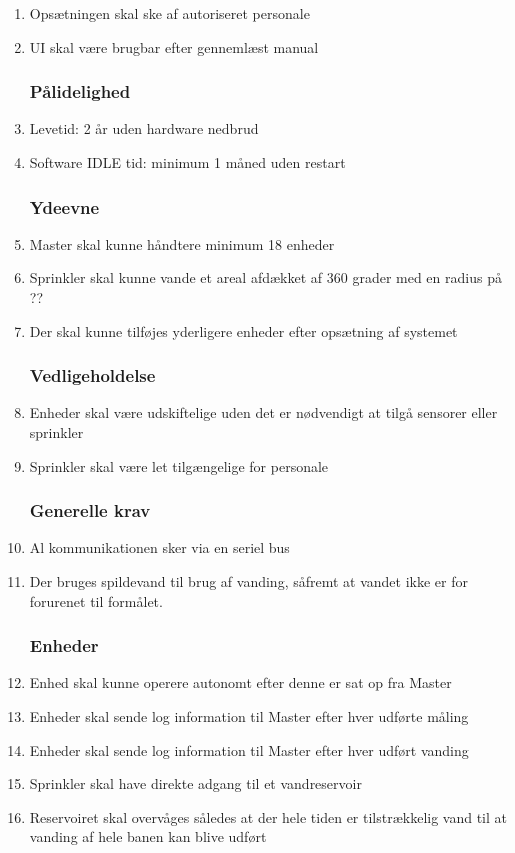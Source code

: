\begin{enumerate}

\subsubsection*{Brugbarhed}
\item Opsætningen skal ske af autoriseret personale
\item UI skal være brugbar efter gennemlæst manual


\subsubsection*{Pålidelighed}
\item Levetid: 2 år uden hardware nedbrud
\item Software IDLE tid: minimum 1 måned uden restart


\subsubsection*{Ydeevne}
\item Master skal kunne håndtere minimum 18 enheder
\item Sprinkler skal kunne vande et areal afdækket af 360 grader med en radius på ??
\item Der skal kunne tilføjes yderligere enheder efter opsætning af systemet


\subsubsection*{Vedligeholdelse}
\item Enheder skal være udskiftelige uden det er nødvendigt at tilgå sensorer eller sprinkler
\item Sprinkler skal være let tilgængelige for personale


\subsubsection*{Generelle krav}
\item Al kommunikationen sker via en seriel bus 
\item Der bruges spildevand til brug af vanding, såfremt at vandet ikke er for forurenet til formålet. 


\subsubsection*{Enheder}
\item Enhed skal kunne operere autonomt efter denne er sat op fra Master
\item Enheder skal sende log information til Master efter hver udførte måling
\item Enheder skal sende log information til Master efter hver udført vanding
\item Sprinkler skal have direkte adgang til et vandreservoir 
\item Reservoiret skal overvåges således at der hele tiden er tilstrækkelig vand til at vanding af hele banen kan blive udført



\end{enumerate}
